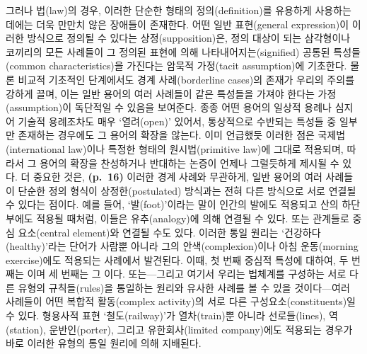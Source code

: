 그러나 법(law)의 경우, 이러한 단순한 형태의 정의(definition)를 유용하게
사용하는 데에는 더욱 만만치 않은 장애들이 존재한다. 어떤 일반
표현(general expression)이 이러한 방식으로 정의될 수 있다는
상정(supposition)은, 정의 대상이 되는 삼각형이나 코끼리의 모든 사례들이
그 정의된 표현에 의해 나타내어지는(signified) 공통된 특성들(common
characteristics)을 가진다는 암묵적 가정(tacit assumption)에 기초한다.
물론 비교적 기초적인 단계에서도 경계 사례(borderline cases)의 존재가
우리의 주의를 강하게 끌며, 이는 일반 용어의 여러 사례들이 같은 특성들을
가져야 한다는 가정(assumption)이 독단적일 수 있음을 보여준다. 종종 어떤
용어의 일상적 용례나 심지어 기술적 용례조차도 매우 ‘열려(open)’ 있어서,
통상적으로 수반되는 특성들 중 일부만 존재하는 경우에도 그 용어의 확장을
 않는다. 이미 언급했듯 이러한 점은
국제법(international law)이나 특정한 형태의 원시법(primitive law)에
그대로 적용되며, 따라서 그 용어의 확장을 찬성하거나 반대하는 논증이
언제나 그럴듯하게 제시될 수 있다. 더 중요한 것은, \textbf{(p.~16)}
이러한 경계 사례와 무관하게, 일반 용어의 여러 사례들이 단순한 정의
형식이 상정한(postulated) 방식과는 전혀 다른 방식으로 서로 연결될 수
있다는 점이다. 예를 들어, ‘발(foot)’이라는 말이 인간의 발에도 적용되고
산의 하단부에도 적용될 때처럼, 이들은 유추(analogy)에 의해 연결될 수
있다. 또는  관계들로 중심 요소(central
element)와 연결될 수도 있다. 이러한 통일 원리는 ‘건강하다(healthy)’라는
단어가 사람뿐 아니라 그의 안색(complexion)이나 아침 운동(morning
exercise)에도 적용되는 사례에서 발견된다. 이때, 첫 번째 중심적 특성에
대하여, 두 번째는 이며 세 번째는 그
이다. 또는---그리고 여기서 우리는 법체계를 구성하는
서로 다른 유형의 규칙들(rules)을 통일하는 원리와 유사한 사례를 볼 수
있을 것이다---여러 사례들이 어떤 복합적 활동(complex activity)의 서로
다른 구성요소(constituents)일 수 있다. 형용사적 표현 ‘철도(railway)’가
열차(train)뿐 아니라 선로들(lines), 역(station), 운반인(porter), 그리고
유한회사(limited company)에도 적용되는 경우가 바로 이러한 유형의 통일
원리에 의해 지배된다.

